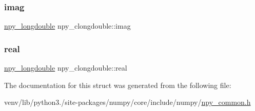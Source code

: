 \subsubsection{\texorpdfstring{imag}{imag}}
{\footnotesize\ttfamily \hyperlink{npy__common_8h_ad677a4063faf32de2fe57fdf0fbbf1fa}{npy\+\_\+longdouble} npy\+\_\+clongdouble\+::imag}

\mbox{\label{structnpy__clongdouble_a0c1428764f767854aa68b3f5869929b4}} 
\subsubsection{\texorpdfstring{real}{real}}
{\footnotesize\ttfamily \hyperlink{npy__common_8h_ad677a4063faf32de2fe57fdf0fbbf1fa}{npy\+\_\+longdouble} npy\+\_\+clongdouble\+::real}



The documentation for this struct was generated from the following file\+:\begin{DoxyCompactItemize}
\item 
venv/lib/python3./site-\/packages/numpy/core/include/numpy/\hyperlink{npy__common_8h}{npy\+\_\+common.\+h}\end{DoxyCompactItemize}
